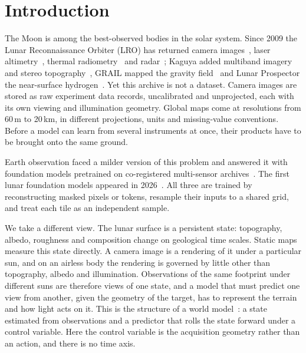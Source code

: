 \section{Introduction}
\label{sec:intro}

The Moon is among the best-observed bodies in the solar system. Since 2009 the Lunar Reconnaissance Orbiter (LRO) has returned camera images~\cite{robinson2010lunar}, laser altimetry~\cite{smith2010lunar}, thermal radiometry~\cite{paige2010lunar} and radar~\cite{nozette2010lunar}; Kaguya added multiband imagery and stereo topography~\cite{kato2010kaguya,ohtake2008performance}, GRAIL mapped the gravity field~\cite{zuber2013gravity} and Lunar Prospector the near-surface hydrogen~\cite{binder1998lunar,lawrence2022global}. Yet this archive is not a dataset. Camera images are stored as raw experiment data records, uncalibrated and unprojected, each with its own viewing and illumination geometry. Global maps come at resolutions from 60\,m to 20\,km, in different projections, units and missing-value conventions. Before a model can learn from several instruments at once, their products have to be brought onto the same ground.

Earth observation faced a milder version of this problem and answered it with foundation models pretrained on co-registered multi-sensor archives~\cite{cong2022satmae,fuller2023croma,jakubik2025terramind,tseng2025galileo,astruc2025anysat}. The first lunar foundation models appeared in 2026~\cite{fraccaro2026multimodal,gironamata2026lunarfm,prasad2026moonstone}. All three are trained by reconstructing masked pixels or tokens, resample their inputs to a shared grid, and treat each tile as an independent sample.

We take a different view. The lunar surface is a persistent state: topography, albedo, roughness and composition change on geological time scales. Static maps measure this state directly. A camera image is a rendering of it under a particular sun, and on an airless body the rendering is governed by little other than topography, albedo and illumination. Observations of the same footprint under different suns are therefore views of one state, and a model that must predict one view from another, given the geometry of the target, has to represent the terrain and how light acts on it. This is the structure of a world model~\cite{ha2018recurrent,lecun2022path}: a state estimated from observations and a predictor that rolls the state forward under a control variable. Here the control variable is the acquisition geometry rather than an action, and there is no time axis.

